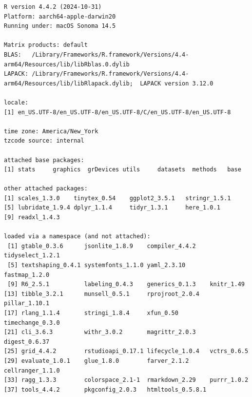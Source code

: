 \documentclass[
  letterpaper,
  DIV=11,
  numbers=noendperiod]{scrartcl}
\begin{document}
\begin{verbatim}
R version 4.4.2 (2024-10-31)
Platform: aarch64-apple-darwin20
Running under: macOS Sonoma 14.5

Matrix products: default
BLAS:   /Library/Frameworks/R.framework/Versions/4.4-arm64/Resources/lib/libRblas.0.dylib 
LAPACK: /Library/Frameworks/R.framework/Versions/4.4-arm64/Resources/lib/libRlapack.dylib;  LAPACK version 3.12.0

locale:
[1] en_US.UTF-8/en_US.UTF-8/en_US.UTF-8/C/en_US.UTF-8/en_US.UTF-8

time zone: America/New_York
tzcode source: internal

attached base packages:
[1] stats     graphics  grDevices utils     datasets  methods   base     

other attached packages:
[1] scales_1.3.0    tinytex_0.54    ggplot2_3.5.1   stringr_1.5.1  
[5] lubridate_1.9.4 dplyr_1.1.4     tidyr_1.3.1     here_1.0.1     
[9] readxl_1.4.3   

loaded via a namespace (and not attached):
 [1] gtable_0.3.6      jsonlite_1.8.9    compiler_4.4.2    tidyselect_1.2.1 
 [5] textshaping_0.4.1 systemfonts_1.1.0 yaml_2.3.10       fastmap_1.2.0    
 [9] R6_2.5.1          labeling_0.4.3    generics_0.1.3    knitr_1.49       
[13] tibble_3.2.1      munsell_0.5.1     rprojroot_2.0.4   pillar_1.10.1    
[17] rlang_1.1.4       stringi_1.8.4     xfun_0.50         timechange_0.3.0 
[21] cli_3.6.3         withr_3.0.2       magrittr_2.0.3    digest_0.6.37    
[25] grid_4.4.2        rstudioapi_0.17.1 lifecycle_1.0.4   vctrs_0.6.5      
[29] evaluate_1.0.1    glue_1.8.0        farver_2.1.2      cellranger_1.1.0 
[33] ragg_1.3.3        colorspace_2.1-1  rmarkdown_2.29    purrr_1.0.2      
[37] tools_4.4.2       pkgconfig_2.0.3   htmltools_0.5.8.1
\end{verbatim}
\end{document}
